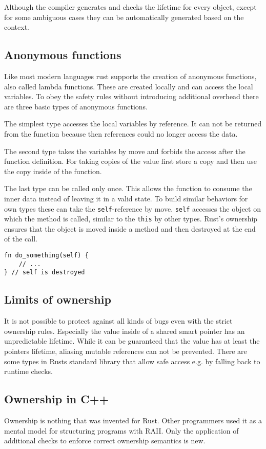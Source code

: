 \documentclass[conference,twocolumn]{IEEEtran}
\begin{document}
Although the compiler generates and checks the lifetime for every object, except for some ambiguous cases they can be automatically generated based on the context.

\subsection{Anonymous functions}
Like most modern languages rust supports the creation of anonymous functions, also called lambda functions. These are created locally and can access the local variables. To obey the safety rules without introducing additional overhead there are three basic types of anonymous functions.

The simplest type accesses the local variables by reference. It can not be returned from the function because then references could no longer access the data.

The second type takes the variables by move and forbids the access after the function definition. For taking copies of the value first store a copy and then use the copy inside of the function.

The last type can be called only once. This allows the function to consume the inner data instead of leaving it in a valid state. To build similar behaviors for own types these can take the \verb|self|-reference by move. \verb|self| accesses the object on which the method is called, similar to the \verb|this| by other types. Rust's ownership ensures that the object is moved inside a method and then destroyed at the end of the call.
\begin{lstlisting}[frame=single]
fn do_something(self) {
    // ...
} // self is destroyed
\end{lstlisting}

\subsection{Limits of ownership}
It is not possible to protect against all kinds of bugs even with the strict ownership rules. Especially the value inside of a shared smart pointer has an unpredictable lifetime. While it can be guaranteed that the value has at least the pointers lifetime, aliasing mutable references can not be prevented. There are some types in Rusts standard library that allow safe access e.g. by falling back to runtime checks.


\subsection{Ownership in C++}
Ownership is nothing that was invented for Rust. Other programmers used it as a mental model for structuring programs with RAII. Only the application of additional checks to enforce correct ownership semantics is new.
\end{document}
